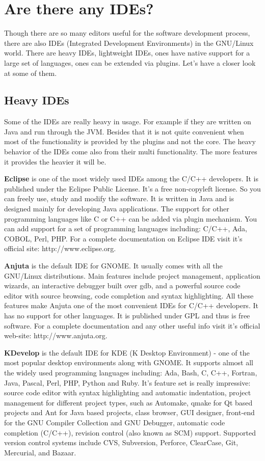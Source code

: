 
\section{Are there any IDEs?}
\label{ide}
Though there are so many editors useful for the software development process, there are also IDEs (Integrated Development Environments) in the GNU/Linux world. There are heavy IDEs, lightweight IDEs, ones have native support for a large set of languages, ones can be extended via plugins. Let's have a closer look at some of them.

\subsection{Heavy IDEs}
Some of the IDEs are really heavy in usage. For example if they are written on Java and run through the JVM. Besides that it is not quite convenient when most of the functionality is provided by the plugins and not the core. The heavy behavior of the IDEs come also from their multi functionality. The more features it provides the heavier it will be.

\textbf {Eclipse} is one of the most widely used IDEs among the C/C++ developers. It is published under the Eclipse Public License. It's a free non-copyleft license. So you can freely use, study and modify the software. It is written in Java and is designed mainly for developing Java applications. The support for other programming languages like C or C++ can be added via plugin mechanism. You can add support for a set of programming languages including: C/C++, Ada, COBOL, Perl, PHP. For a complete documentation on Eclipse IDE visit it's official site: http://www.eclipse.org.

\textbf {Anjuta} is the default IDE for GNOME. It usually comes with all the GNU/Linux distributions. Main features include project management, application wizards, an interactive debugger built over gdb, and a powerful source code editor with source browsing, code completion and syntax highlighting. All these features make Anjuta one of the most convenient IDEs for C/C++ developers. It has no support for other languages. It is published under GPL and thus is free software. For a complete documentation and any other useful info visit it's official web-site: http://www.anjuta.org. 

\textbf {KDevelop} is the default IDE for KDE (K Desktop Environment) - one of the most popular desktop environments along with GNOME. It supports almost all the widely used programming languages including: Ada, Bash, C, C++, Fortran, Java, Pascal, Perl, PHP, Python and Ruby. It's feature set is really impressive: source code editor with syntax highlighting and automatic indentation, project management for different project types, such as Automake, qmake for Qt based projects and Ant for Java based projects, class browser, GUI designer, front-end for the GNU Compiler Collection and GNU Debugger, automatic code completion (C/C++), revision control (also known as SCM) support. Supported version control systems include CVS, Subversion, Perforce, ClearCase, Git, Mercurial, and Bazaar.

